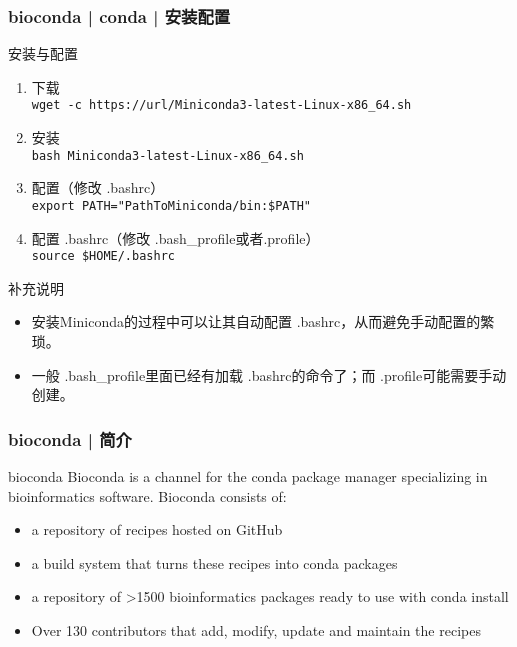 \begin{frame}[fragile]
  \frametitle{bioconda | conda | 安装配置}
  \begin{block}{安装与配置}
    \begin{enumerate}
      \item 下载\\ \verb|wget -c https://url/Miniconda3-latest-Linux-x86_64.sh|
      \item 安装\\ \verb|bash Miniconda3-latest-Linux-x86_64.sh|
      \item 配置（修改 .bashrc）\\ \verb|export PATH="PathToMiniconda/bin:$PATH"|
      \item 配置 .bashrc（修改 .bash\_profile或者.profile）\\ \verb|source $HOME/.bashrc|
    \end{enumerate}
  \end{block}
  \pause
  \begin{block}{补充说明}
    \begin{itemize}
      \item {\footnotesize 安装Miniconda的过程中可以让其自动配置 .bashrc，从而避免手动配置的繁琐。}
      \item {\footnotesize 一般 .bash\_profile里面已经有加载 .bashrc的命令了；而 .profile可能需要手动创建。}
    \end{itemize}
  \end{block}
\end{frame}

\begin{frame}
  \frametitle{bioconda | 简介}
  \begin{block}{bioconda}
    Bioconda is a channel for the conda package manager specializing in bioinformatics software. Bioconda consists of:
    \begin{itemize}
      \item a repository of recipes hosted on GitHub
      \item a build system that turns these recipes into conda packages
      \item a repository of >1500 bioinformatics packages ready to use with conda install
      \item Over 130 contributors that add, modify, update and maintain the recipes
    \end{itemize}
  \end{block}
\end{frame}

